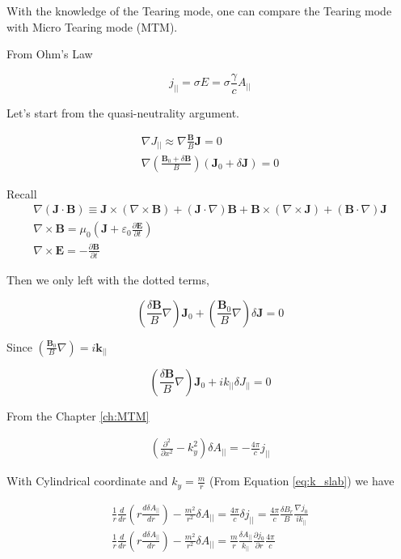 With the knowledge of the Tearing mode, one can compare the Tearing mode with Micro Tearing mode (MTM).


From Ohm's Law 

\begin{equation}
    j_{||}=\sigma E = \sigma \frac{\gamma}{c} A_{||}
\end{equation}

Let's start from the quasi-neutrality argument.

\begin{eqnarray}
    \nabla J_{||} \approx \nabla \frac{\textbf{B}}{B} \textbf{J}=0\\
    \nabla (\frac{\textbf{B}_0+\delta \textbf{B}}{B})(\textbf{J}_0+\delta \textbf{J})=0
\end{eqnarray}

Recall 
\begin{eqnarray}
    \nabla(\textbf{J} \cdot \textbf{B}) \equiv \textbf{J} \times(\nabla \times \textbf{B})+(\textbf{J} \cdot \nabla) \textbf{B}+\textbf{B} \times(\nabla \times \textbf{J})+(\textbf{B} \cdot \nabla) \textbf{J}\\
    \nabla \times \mathbf{B}=\mu_{0}\left(\mathbf{J}+\varepsilon_{0} \frac{\partial \mathbf{E}}{\partial t}\right)\\
    \nabla \times \mathbf{E}=-\frac{\partial \mathbf{B}}{\partial t}
\end{eqnarray}

Then we only left with the dotted terms, 

\begin{equation}
    (\frac{\delta \textbf{B}}{B} \nabla )\textbf{J}_0+(\frac{\textbf{B}_0}{B} \nabla) \delta \textbf{J}=0
\end{equation}

Since $(\frac{\textbf{B}_0}{B} \nabla) = i \textbf{k}_{||}$

\begin{equation}
    (\frac{\delta \textbf{B}}{B} \nabla )\textbf{J}_0+ik_{||}\delta J_{||}=0
\end{equation}

From the Chapter \ref{ch:MTM}

\begin{eqnarray}
    (\frac{\partial^2}{\partial x ^2} -k_{y}^2)\delta A_{||}=-\frac{4\pi}{c} j_{||}
\end{eqnarray}

With Cylindrical coordinate and $k_y=\frac{m}{r}$ (From Equation \ref{eq:k_slab}) we have

\begin{eqnarray}
    \frac{1}{r}\frac{d}{dr}(r\frac{d \delta A_{||}}{dr}) -\frac{m^2}{r^2} \delta A_{||}=\frac{4\pi}{c} \delta j_{||}= \frac{4\pi}{c}\frac{\delta B_r}{B}\frac{\nabla j_0}{ik_{||}}\\
    \frac{1}{r}\frac{d}{dr}(r\frac{d \delta A_{||}}{dr}) -\frac{m^2}{r^2} \delta A_{||}=\frac{m}{r}\frac{\delta A_{||}}{k_{||}}\frac{\partial j_0}{\partial r} \frac{4\pi}{c}
\end{eqnarray}

